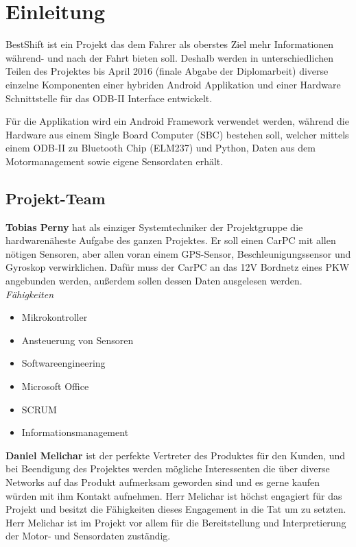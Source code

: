 \chapter{Einleitung}
BestShift ist ein Projekt das dem Fahrer als oberstes Ziel mehr Informationen während- und nach der Fahrt bieten soll. Deshalb werden in unterschiedlichen Teilen des Projektes bis April 2016 (finale Abgabe der Diplomarbeit) diverse einzelne Komponenten einer hybriden Android Applikation und einer Hardware Schnittstelle für das ODB-II Interface entwickelt. 

Für die Applikation wird ein Android Framework verwendet werden, während die Hardware aus einem Single Board Computer (SBC) bestehen soll, welcher mittels einem ODB-II zu Bluetooth Chip (ELM237) und Python, Daten aus dem Motormanagement sowie eigene Sensordaten erhält. 

\newpage
\section{Projekt-Team}
\textbf{Tobias Perny} hat als einziger Systemtechniker der Projektgruppe die hardwarenäheste Aufgabe des ganzen Projektes. Er soll einen CarPC mit allen nötigen Sensoren, aber allen voran einem GPS-Sensor, Beschleunigungssensor und Gyroskop verwirklichen. Dafür muss der CarPC an das 12V Bordnetz eines PKW angebunden werden, außerdem sollen dessen Daten ausgelesen werden.
\nextline 
\textit{Fähigkeiten}
\begin{itemize}
	\item Mikrokontroller
	\item Ansteuerung von Sensoren		
	\item Softwareengineering
	\item Microsoft Office
	\item SCRUM
	\item Informationsmanagement
\end{itemize}

\nextline

\textbf{Daniel Melichar} ist der perfekte Vertreter des Produktes für den Kunden, und bei Beendigung des Projektes werden mögliche Interessenten die über diverse Networks auf das Produkt aufmerksam geworden sind und es gerne kaufen würden mit ihm Kontakt aufnehmen. Herr Melichar ist höchst engagiert für das Projekt und besitzt die Fähigkeiten dieses Engagement in die Tat um zu setzten. Herr Melichar ist im Projekt vor allem für die Bereitstellung und Interpretierung der Motor- und Sensordaten zuständig. 


